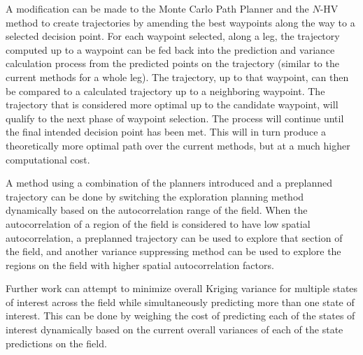 A modification can be made to the Monte Carlo Path Planner and the $N$-HV method to create trajectories by amending the best waypoints along the way to a selected decision point. For each waypoint selected, along a leg, the trajectory computed up to a waypoint can be fed back into the prediction and variance calculation process from the predicted points on the trajectory (similar to the current methods for a whole leg). The trajectory, up to that waypoint, can then be compared to a calculated trajectory up to a neighboring waypoint. The trajectory that is considered more optimal up to the candidate waypoint, will qualify to the next phase of waypoint selection. The process will continue until the final intended decision point has been met. This will in turn produce a theoretically more optimal path over the current methods, but at a much higher computational cost.

A method using a combination of the planners introduced and a preplanned trajectory can be done by switching the exploration planning method dynamically based on the autocorrelation range of the field. When the autocorrelation of a region of the field is considered to have low spatial autocorrelation, a preplanned trajectory can be used to explore that section of the field, and another variance suppressing method can be used to explore the regions on the field with higher spatial autocorrelation factors.

Further work can attempt to minimize overall Kriging variance for multiple states of interest across the field while simultaneously predicting more than one state of interest. This can be done by weighing the cost of predicting each of the states of interest dynamically based on the current overall variances of each of the state predictions on the field.
